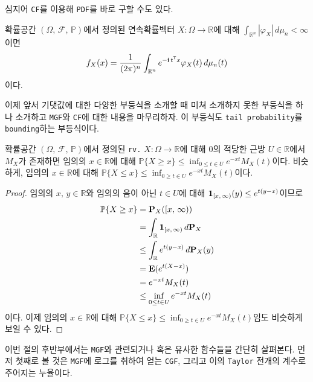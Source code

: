 심지어 \texttt{CF}를 이용해 \texttt{PDF}를 바로 구할 수도 있다.

\begin{theorem}
    확률공간 $(\Omega,\,\mathcal{F},\,\mathbb{P})$에서 정의된 연속확률벡터 $X:\Omega\to\mathbb{R}$에 대해 $\int_{\mathbb{R}^n}|\varphi_X|\,d\mu_n<\infty$이면
    \begin{equation*}
        f_X(x)=\frac{1}{(2\pi)^n}\int_{\mathbb{R}^n}e^{-\mathbf{i}\,t^{\mathsf{T}} x}\varphi_X(t)\,d\mu_n(t)
    \end{equation*}
    이다.
\end{theorem}

이제 앞서 기댓값에 대한 다양한 부등식을 소개할 때 미쳐 소개하지 못한 부등식을 하나 소개하고 \texttt{MGF}와 \texttt{CF}에 대한 내용을 마무리하자. 이 부등식도 \texttt{tail probability}를 \texttt{bounding}하는 부등식이다.

\begin{theorem}
    확률공간 $(\Omega,\,\mathcal{F},\,\mathbb{P})$에서 정의된 \texttt{rv.} $X:\Omega\to\mathbb{R}$에 대해 $0$의 적당한 근방 $U\in\mathbb{R}$에서 $M_X$가 존재하면 임의의 $x\in\mathbb{R}$에 대해 $\mathbb{P}\{X\geq x\}\leq\inf_{0\leq t\in U}e^{-xt}M_X(t)$이다. 비슷하게, 임의의 $x\in\mathbb{R}$에 대해 $\mathbb{P}\{X\leq x\}\leq\inf_{0\geq t\in U}e^{-xt}M_X(t)$이다.
\end{theorem}

\begin{proof}
    임의의 $x,\,y\in\mathbb{R}$와 임의의 음이 아닌 $t\in U$에 대해 $\mathbf{1}_{[x,\,\infty)}(y)\leq e^{t(y-x)}$이므로
    \begin{align*}
        \mathbb{P}\{X\geq x\}&=\mathbf{P}_X([x,\,\infty))\\
        &=\int_\mathbb{R}\mathbf{1}_{[x,\,\infty)}\,d\mathbf{P}_X\\
        &\leq\int_\mathbb{R}e^{t(y-x)}\,d\mathbf{P}_X(y)\\
        &=\mathbf{E}(e^{t(X-x)})\\
        &=e^{-xt}M_X(t)\\
        &\leq\inf_{0\leq t\in U}e^{-xt}M_X(t)
    \end{align*}
    이다. 이제 임의의 $x\in\mathbb{R}$에 대해 $\mathbb{P}\{X\leq x\}\leq\inf_{0\geq t\in U}e^{-xt}M_X(t)$임도 비슷하게 보일 수 있다.
\end{proof}

이번 절의 후반부에서는 \texttt{MGF}와 관련되거나 혹은 유사한 함수들을 간단히 살펴본다. 먼저 첫째로 볼 것은 \texttt{MGF}에 로그를 취하여 얻는 \texttt{CGF}, 그리고 이의 \texttt{Taylor} 전개의 계수로 주어지는 누율이다.

